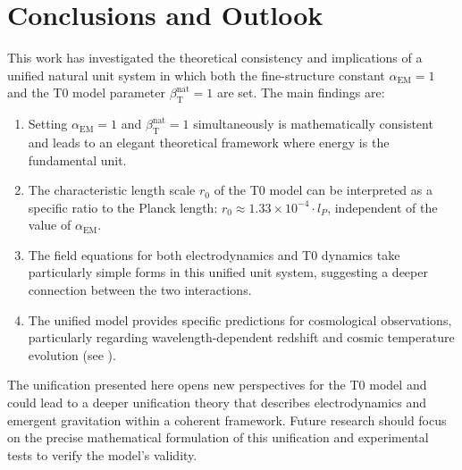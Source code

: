 \documentclass[12pt,a4paper]{article}
\newcommand{\alphaEM}{\alpha_{\text{EM}}}
\newcommand{\betaT}{\beta_{\text{T}}}
\begin{document}
	\section{Conclusions and Outlook}
	\label{sec:conclusions}
	
	This work has investigated the theoretical consistency and implications of a unified natural unit system in which both the fine-structure constant \(\alphaEM = 1\) and the T0 model parameter \(\betaT^{\text{nat}} = 1\) are set. The main findings are:
	
	\begin{enumerate}
		\item Setting \(\alphaEM = 1\) and \(\betaT^{\text{nat}} = 1\) simultaneously is mathematically consistent and leads to an elegant theoretical framework where energy is the fundamental unit.
		\item The characteristic length scale \(r_0\) of the T0 model can be interpreted as a specific ratio to the Planck length: \(r_0 \approx 1.33 \times 10^{-4} \cdot l_P\), independent of the value of \(\alphaEM\).
		\item The field equations for both electrodynamics and T0 dynamics take particularly simple forms in this unified unit system, suggesting a deeper connection between the two interactions.
		\item The unified model provides specific predictions for cosmological observations, particularly regarding wavelength-dependent redshift and cosmic temperature evolution (see \cite{pascher_messdifferenzen_2025}).
	\end{enumerate}
	
	The unification presented here opens new perspectives for the T0 model and could lead to a deeper unification theory that describes electrodynamics and emergent gravitation within a coherent framework. Future research should focus on the precise mathematical formulation of this unification and experimental tests to verify the model's validity.
	
\end{document}
